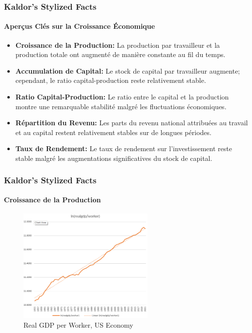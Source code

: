 \documentclass{beamer}
\begin{document}
\begin{frame}
    \frametitle{Kaldor's Stylized Facts}
    \hypertarget{kaldor}{} %
    \framesubtitle{Aperçus Clés sur la Croissance Économique}
        \begin{itemize}
            \item \textbf{Croissance de la Production:} 
            La production par travailleur et la production totale ont augmenté de 
            manière constante au fil du temps.
            \hyperlink{growth}{}
            \item \textbf{Accumulation de Capital:} 
            Le stock de capital par travailleur augmente; cependant, le ratio 
            capital-production reste relativement stable.
            \hyperlink{capital}{}
            \item \textbf{Ratio Capital-Production:}
            Le ratio entre le capital et la production 
            montre une remarquable stabilité malgré les fluctuations 
            économiques.
            \hyperlink{capital_output_ratio}{}
            \item \textbf{Répartition du Revenu:} 
            Les parts du revenu national attribuées au travail et au capital 
            restent relativement stables sur de longues périodes.
            \hyperlink{income}{}
            \item \textbf{Taux de Rendement:} Le taux de rendement sur l'investissement reste stable malgré les augmentations significatives du stock de capital.
            \hyperlink{return}{}
        \end{itemize}
\end{frame}


\begin{frame}
    \frametitle{Kaldor's Stylized Facts}
    \hypertarget{growth}{} %
    \framesubtitle{Croissance de la Production}
        \begin{figure}
            \centering
            \includegraphics[width=0.6\textwidth]{graphs/lnrgdp_usa.png}
            \caption{Real GDP per Worker, US Economy
            \hyperlink{kaldor}{}}
        \end{figure}
\end{frame}
\end{document}
